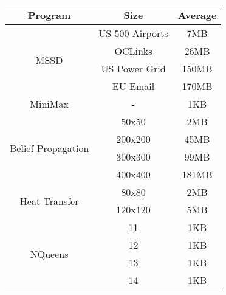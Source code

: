 \begin{tabular}{c | c | c } \hline
	\textbf{Program} & \textbf{Size} & \textbf{Average} \\ \hline \hline
	\multirow{4}{*}{MSSD}  & US 500 Airports & 7MB\\
		 & OCLinks & 26MB\\
		 & US Power Grid & 150MB\\
		 & EU Email & 170MB\\
	\hline
	MiniMax  & - & 1KB\\
	\hline
	\multirow{4}{*}{Belief Propagation}  & 50x50 & 2MB\\
		 & 200x200 & 45MB\\
		 & 300x300 & 99MB\\
		 & 400x400 & 181MB\\
	\hline
	\multirow{2}{*}{Heat Transfer}  & 80x80 & 2MB\\
		 & 120x120 & 5MB\\
	\hline
	\multirow{4}{*}{NQueens}  & 11 & 1KB\\
		 & 12 & 1KB\\
		 & 13 & 1KB\\
		 & 14 & 1KB\\
	\hline
\end{tabular}
